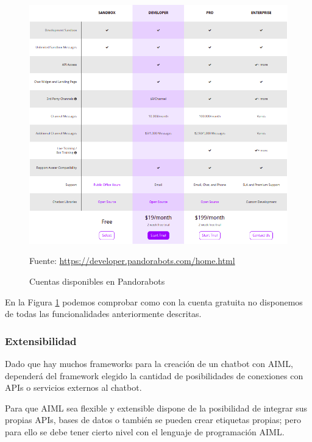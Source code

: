 \newpage

\begin{figure}[h]
\centering
\includegraphics[width=1.0\textwidth]{imagenes/02_EstadoDelArte/cuentas_pandorabots.png}
\begin{center}
Fuente: \url{https://developer.pandorabots.com/home.html}
\end{center}
\caption{Cuentas disponibles en Pandorabots}
\label{fig:cuenta_pandorabots}
\end{figure}

En la Figura \ref{fig:cuenta_pandorabots} podemos comprobar como con la cuenta gratuita no disponemos de todas las funcionalidades anteriormente descritas.

\subsubsection*{Extensibilidad}

Dado que hay muchos \glspl{framework} para la creación de un chatbot con AIML, dependerá del \gls{framework} elegido la cantidad de posibilidades de conexiones con \glspl{API} o servicios externos al chatbot.

Para que AIML sea flexible y extensible dispone de la posibilidad de integrar sus propias \glspl{API}, bases de datos o también se pueden crear etiquetas propias; pero para ello se debe tener cierto nivel con el lenguaje de programación AIML.

